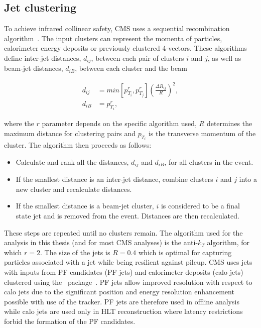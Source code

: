 \subsection{Jet clustering}

To achieve infrared collinear safety, CMS uses a sequential recombination algorithm~\cite{antikt}. The input clusters can represent
the momenta of particles, calorimeter energy deposits or previously clustered
4-vectors. These algorithms define inter-jet distances, $d_{ij}$, between each pair of clusters $i$ and $j$, 
as well as beam-jet distances, $d_{iB}$, between each cluster and the beam 

\begin{align}
d_{ij} &= min\left[p^r_{T_i},p^r_{T_j}\right]\left(\frac{\Delta R_{ij}}{R}\right)^2,\nonumber\\
d_{iB} &= p^r_{T_i},
\end{align}

\noindent where the $r$ parameter depends on the specific algorithm used, $R$ determines the maximum distance
for clustering pairs and $p_{T_i}$ is the transverse momentum of the cluster. The algorithm then proceeds
as follows:
\begin{itemize}
\item Calculate and rank all the distances, $d_{ij}$ and $d_{iB}$, for all clusters in the event.
\item If the smallest distance is an inter-jet distance, combine clusters $i$ and $j$ into a new cluster and recalculate distances.
\item If the smallest distance is a beam-jet cluster, $i$ is considered to be a final state jet and is removed from the event. Distances 
are then recalculated.
\end{itemize}

These steps are repeated until no clusters remain. The algorithm used for the analysis in this thesis (and for most CMS analyses) is 
the anti-$k_T$ algorithm, for which $r=2$. The size of the jets is $R=0.4$ which is optimal for capturing particles
associated with a jet while being resilient against pileup. CMS uses jets with inputs from PF candidates (PF jets) and calorimeter deposits (calo jets)
clustered using the \FASTJET~package~\cite{fastjet}. PF jets allow improved resolution with respect to calo jets due to the significant position and energy resolution 
enhancement possible with use of the tracker. PF jets are therefore used in offline analysis while calo jets are used only in HLT reconstruction
where latency restrictions forbid the formation of the PF candidates. 

